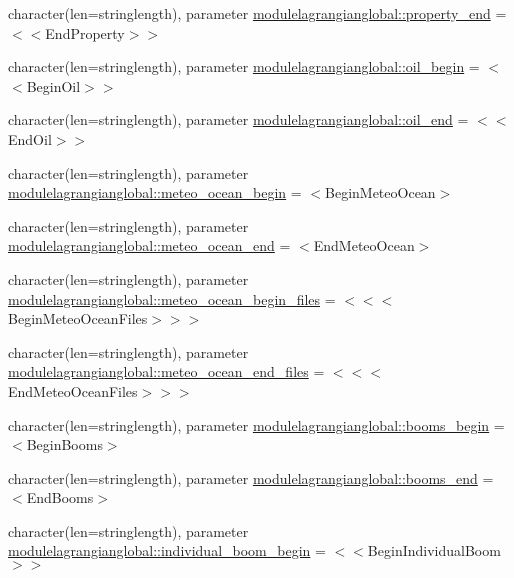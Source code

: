 \begin{DoxyCompactItemize}
character(len=stringlength), parameter \mbox{\hyperlink{namespacemodulelagrangianglobal_a9bd2e46e67ee2ef39c13da350d1d13a3}{modulelagrangianglobal\+::property\+\_\+end}} = \textquotesingle{}$<$$<$End\+Property$>$$>$\textquotesingle{}
\item 
character(len=stringlength), parameter \mbox{\hyperlink{namespacemodulelagrangianglobal_a516f299b20c66010fb5ab2c915c56a2b}{modulelagrangianglobal\+::oil\+\_\+begin}} = \textquotesingle{}$<$$<$Begin\+Oil$>$$>$\textquotesingle{}
\item 
character(len=stringlength), parameter \mbox{\hyperlink{namespacemodulelagrangianglobal_afb1122a347d5f5a7b75ab0beb4f66b1d}{modulelagrangianglobal\+::oil\+\_\+end}} = \textquotesingle{}$<$$<$End\+Oil$>$$>$\textquotesingle{}
\item 
character(len=stringlength), parameter \mbox{\hyperlink{namespacemodulelagrangianglobal_a3677833a62a1147dfe57984b42e6900e}{modulelagrangianglobal\+::meteo\+\_\+ocean\+\_\+begin}} = \textquotesingle{}$<$Begin\+Meteo\+Ocean$>$\textquotesingle{}
\item 
character(len=stringlength), parameter \mbox{\hyperlink{namespacemodulelagrangianglobal_af344e4f89d0dffe74f0327c7295de4aa}{modulelagrangianglobal\+::meteo\+\_\+ocean\+\_\+end}} = \textquotesingle{}$<$End\+Meteo\+Ocean$>$\textquotesingle{}
\item 
character(len=stringlength), parameter \mbox{\hyperlink{namespacemodulelagrangianglobal_a260adf35d65f5de8c2ef2f7210ab46c4}{modulelagrangianglobal\+::meteo\+\_\+ocean\+\_\+begin\+\_\+files}} = \textquotesingle{}$<$$<$$<$Begin\+Meteo\+Ocean\+Files$>$$>$$>$\textquotesingle{}
\item 
character(len=stringlength), parameter \mbox{\hyperlink{namespacemodulelagrangianglobal_ac742669b1bfe7c85dbd7b57c2a561692}{modulelagrangianglobal\+::meteo\+\_\+ocean\+\_\+end\+\_\+files}} = \textquotesingle{}$<$$<$$<$End\+Meteo\+Ocean\+Files$>$$>$$>$\textquotesingle{}
\item 
character(len=stringlength), parameter \mbox{\hyperlink{namespacemodulelagrangianglobal_a21b026a8bc49b0585775c97d748d3709}{modulelagrangianglobal\+::booms\+\_\+begin}} = \textquotesingle{}$<$Begin\+Booms$>$\textquotesingle{}
\item 
character(len=stringlength), parameter \mbox{\hyperlink{namespacemodulelagrangianglobal_a671b64cbbc92e525a648cfe2cb1b8a6e}{modulelagrangianglobal\+::booms\+\_\+end}} = \textquotesingle{}$<$End\+Booms$>$\textquotesingle{}
\item 
character(len=stringlength), parameter \mbox{\hyperlink{namespacemodulelagrangianglobal_aaf987cadd3c8ef5f18cd861b433e431e}{modulelagrangianglobal\+::individual\+\_\+boom\+\_\+begin}} = \textquotesingle{}$<$$<$Begin\+Individual\+Boom$>$$>$\textquotesingle{}

\end{DoxyCompactItemize}
